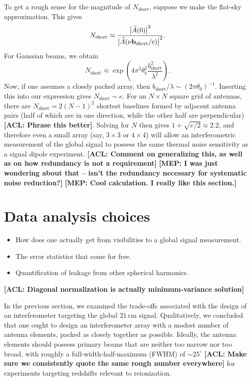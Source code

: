 \documentclass[twolcolumn,apj,iop,numberedappendix]{emulateapj}
\newcommand{\acl}[1]{{\color{red} \textbf{[ACL:  #1]}}}
\newcommand{\mep}[1]{{\color{applegreen} \textbf{[MEP:  #1]}}}
\begin{document}
To get a rough sense for the magnitude of $N_\textrm{short}$, suppose we make the flat-sky approximation. This gives
\begin{equation}
N_\textrm{short} \approx \frac{\big{|} \widetilde{A}(0)\big{|}^2}{\big{|} \widetilde{A}(\nu \mathbf{b}_\textrm{short} / c)\big{|}^2}.
\end{equation}
For Gaussian beams, we obtain
\begin{equation}
N_\textrm{short} \approx \exp \left( 4 \pi^2 \theta_b^2 \frac{b_\textrm{short}^2}{\lambda^2} \right).
\end{equation}
Now, if one assumes a closely packed array, then $b_\textrm{short}/ \lambda \sim (2\pi \theta_0)^{-1}$. Inserting this into our expression gives $N_\textrm{short} \sim e$. For an $N \times N$ square grid of antennas, there are $N_\textrm{short} = 2(N-1)^2$ shortest baselines formed by adjacent antenna pairs (half of which are in one direction, while the other half are perpendicular) \acl{Phrase this better}. Solving for $N$ then gives $1 + \sqrt{e/2} \approx 2.2$, and therefore even a small array (say, $3\times 3$ or $4\times 4$) will allow an interferometric measurement of the global signal to possess the same thermal noise sensitivity as a signal dipole experiment. \acl{Comment on generalizing this, as well as on how redundancy is not a requirement} \mep{I was just wondering about that -- isn't the redundancy necessary for systematic noise reduction?} \mep{Cool calculation. I really like this section.}


\section{Data analysis choices}
\label{sec:MathForm}
\begin{itemize}
\item How does one actually get from visibilities to a global signal measurement.
\item The error statistics that come for free.
\item Quantification of leakage from other spherical harmonics.
\end{itemize}
\acl{Diagonal normalization is actually minimum-variance solution}

In the previous section, we examined the trade-offs associated with the design of an interferometer targeting the global $21\,\textrm{cm}$ signal. Qualitatively, we concluded that one ought to design an interferometer array with a modest number of antenna elements, packed as closely together as possible. Ideally, the antenna elements should possess primary beams that are neither too narrow nor too broad, with roughly a full-width-half-maximum (FWHM) of $\sim 25^\circ$ \acl{Make sure we consistently quote the same rough number everywhere} for experiments targeting redshifts relevant to reionization.
\end{document}

